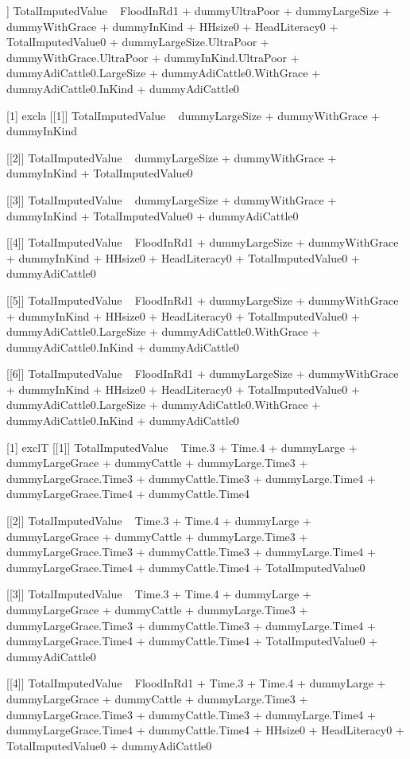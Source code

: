 \begin{Schunk}
\begin{Soutput}
[[6]]
TotalImputedValue ~ FloodInRd1 + dummyUltraPoor + dummyLargeSize + 
    dummyWithGrace + dummyInKind + HHsize0 + HeadLiteracy0 + 
    TotalImputedValue0 + dummyLargeSize.UltraPoor + dummyWithGrace.UltraPoor + 
    dummyInKind.UltraPoor + dummyAdiCattle0.LargeSize + dummyAdiCattle0.WithGrace + 
    dummyAdiCattle0.InKind + dummyAdiCattle0

[1] excla
[[1]]
TotalImputedValue ~ dummyLargeSize + dummyWithGrace + dummyInKind

[[2]]
TotalImputedValue ~ dummyLargeSize + dummyWithGrace + dummyInKind + 
    TotalImputedValue0

[[3]]
TotalImputedValue ~ dummyLargeSize + dummyWithGrace + dummyInKind + 
    TotalImputedValue0 + dummyAdiCattle0

[[4]]
TotalImputedValue ~ FloodInRd1 + dummyLargeSize + dummyWithGrace + 
    dummyInKind + HHsize0 + HeadLiteracy0 + TotalImputedValue0 + 
    dummyAdiCattle0

[[5]]
TotalImputedValue ~ FloodInRd1 + dummyLargeSize + dummyWithGrace + 
    dummyInKind + HHsize0 + HeadLiteracy0 + TotalImputedValue0 + 
    dummyAdiCattle0.LargeSize + dummyAdiCattle0.WithGrace + dummyAdiCattle0.InKind + 
    dummyAdiCattle0

[[6]]
TotalImputedValue ~ FloodInRd1 + dummyLargeSize + dummyWithGrace + 
    dummyInKind + HHsize0 + HeadLiteracy0 + TotalImputedValue0 + 
    dummyAdiCattle0.LargeSize + dummyAdiCattle0.WithGrace + dummyAdiCattle0.InKind + 
    dummyAdiCattle0

[1] exclT
[[1]]
TotalImputedValue ~ Time.3 + Time.4 + dummyLarge + dummyLargeGrace + 
    dummyCattle + dummyLarge.Time3 + dummyLargeGrace.Time3 + 
    dummyCattle.Time3 + dummyLarge.Time4 + dummyLargeGrace.Time4 + 
    dummyCattle.Time4

[[2]]
TotalImputedValue ~ Time.3 + Time.4 + dummyLarge + dummyLargeGrace + 
    dummyCattle + dummyLarge.Time3 + dummyLargeGrace.Time3 + 
    dummyCattle.Time3 + dummyLarge.Time4 + dummyLargeGrace.Time4 + 
    dummyCattle.Time4 + TotalImputedValue0

[[3]]
TotalImputedValue ~ Time.3 + Time.4 + dummyLarge + dummyLargeGrace + 
    dummyCattle + dummyLarge.Time3 + dummyLargeGrace.Time3 + 
    dummyCattle.Time3 + dummyLarge.Time4 + dummyLargeGrace.Time4 + 
    dummyCattle.Time4 + TotalImputedValue0 + dummyAdiCattle0

[[4]]
TotalImputedValue ~ FloodInRd1 + Time.3 + Time.4 + dummyLarge + 
    dummyLargeGrace + dummyCattle + dummyLarge.Time3 + dummyLargeGrace.Time3 + 
    dummyCattle.Time3 + dummyLarge.Time4 + dummyLargeGrace.Time4 + 
    dummyCattle.Time4 + HHsize0 + HeadLiteracy0 + TotalImputedValue0 + 
    dummyAdiCattle0


\end{Soutput}
\end{Schunk}
